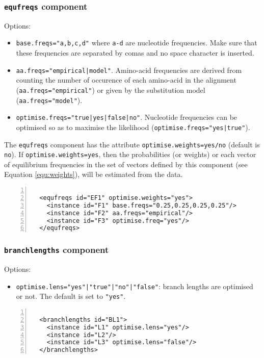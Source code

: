 \documentclass[a4paper,12pt]{article}
\newcommand{\x}[1]{\texttt{#1}}
\begin{document}
\subsubsection{{\tt equfreqs} component}
Options:
\begin{itemize}
\item \x{base.freqs="a,b,c,d"} where \x{a-d} are nucleotide frequencies. Make sure that these
  frequencies are separated by comas and no space character is inserted.
\item \x{aa.freqs="empirical|model"}. Amino-acid frequencies are derived from counting the number of
  occurence of each amino-acid in the alignment (\x{aa.freqs="empirical"}) or given by the
  substitution model (\x{aa.freqs="model"}).
\item \x{optimise.freqs="true|yes|false|no"}. Nucleotide frequencies can be optimised so as to maximise
  the likelihood (\x{optimise.freqs="yes|true"}).
\end{itemize}

The {\tt equfreqs} component has the attribute {\tt optimise.weights=yes/no} (default is {\tt
  no}). If {\tt optimise.weights=yes}, then the probabilities (or weights) or each vector of
equilibrium frequencies in the
set of vectors defined by this component (see Equation \ref{equ:weights}), will be estimated from the data.

\vspace{0.2cm}
\begin{Verbatim}[frame=single, label=Example of `equfreqs' component, samepage=true,
  baselinestretch=0.5, fontsize=\small, numbers=left]

  <equfreqs id="EF1" optimise.weights="yes">
    <instance id="F1" base.freqs="0.25,0.25,0.25,0.25"/>
    <instance id="F2" aa.freqs="empirical"/>
    <instance id="F3" optimise.freq="yes"/>
  </equfreqs>

\end{Verbatim}

\subsubsection{{\tt branchlengths} component}
Options:
\begin{itemize}
\item \x{optimise.lens="yes"|"true"|"no"|"false"}: branch lengths are optimised or not. The default
  is set to \x{"yes"}.
\end{itemize}
\vspace{0.2cm}
\begin{Verbatim}[frame=single, label=Example of `branchlengths' component, baselinestretch=0.5,
  fontsize=\small, numbers=left]

  <branchlengths id="BL1">
    <instance id="L1" optimise.lens="yes"/>
    <instance id="L2"/>
    <instance id="L3" optimise.lens="false"/>
  </branchlengths>

\end{Verbatim}
\end{document}
